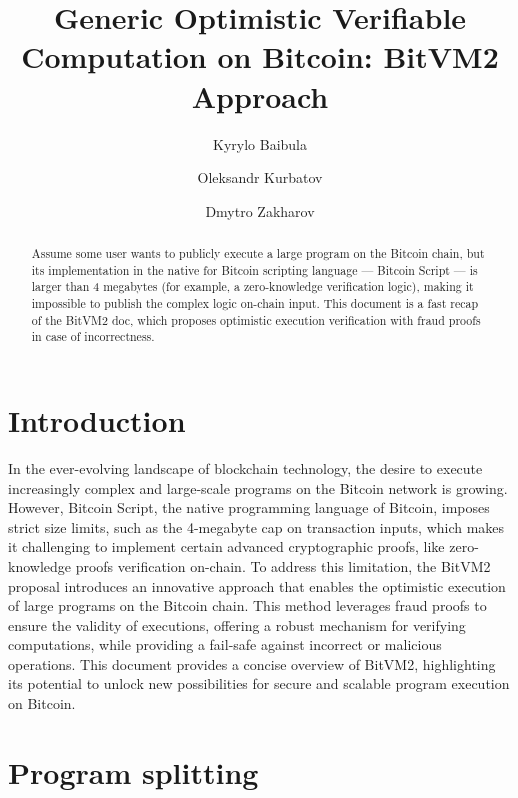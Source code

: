 \documentclass{iacrtrans}
\author{Kyrylo Baibula \inst{1} \and Oleksandr Kurbatov\inst{1} \and
Dmytro Zakharov\inst{1}}
\institute{Distributed Lab
  \email{dmytro.zakharov@distributedlab.com},
\email{ok@distributedlab.com}, \email{kyrylo.baybula@distributedlab.com}}
\title[Verifiable Computation on Bitcoin]{Generic Optimistic
Verifiable Computation on Bitcoin: BitVM2 Approach}
\begin{document}
\maketitle


\begin{abstract}
  Assume some user wants to publicly execute a large program on the
  Bitcoin chain, but its implementation in the native for Bitcoin
  scripting language --- Bitcoin Script --- is larger than 4 megabytes
  (for example, a zero-knowledge verification logic), making it
  impossible to publish the complex logic on-chain input. This
  document is a fast recap of the BitVM2 doc, which proposes
  optimistic execution verification with fraud proofs in case of
  incorrectness.
\end{abstract}

\setcounter{tocdepth}{2}
\tableofcontents

\section{Introduction}\label{sec:intro}

In the ever-evolving landscape of blockchain technology, the desire to
execute increasingly complex and large-scale programs on the
Bitcoin\autocite{bitcoin_paper} network is growing. However, Bitcoin
Script, the native programming language of Bitcoin, imposes strict
size limits, such as the 4-megabyte cap on transaction inputs, which
makes it challenging to implement certain advanced cryptographic
proofs, like zero-knowledge proofs verification on-chain. To address
this limitation, the BitVM2\autocite{bitvm2} proposal introduces an
innovative approach that enables the optimistic execution of large
programs on the Bitcoin chain. This method leverages fraud proofs to
ensure the validity of executions, offering a robust mechanism for
verifying computations, while providing a fail-safe against incorrect
or malicious operations. This document provides a concise overview of
BitVM2, highlighting its potential to unlock new possibilities for
secure and scalable program execution on Bitcoin.

\section{Program splitting}\label{sec:program-splitting}
\end{document}
